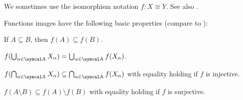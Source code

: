 \begin{definition}
\begin{defenum}
    We sometimes use the isomorphism notation \( f: X \cong Y \). See also .
  \end{defenum}
\end{definition}

\begin{proposition}\label{thm:function_image_properties}
  Functions images have the following basic properties (compare to ):
  \begin{propenum}
     If \( A \subseteq B \), then \( f(A) \subseteq f(B) \).

     \( f(\bigcup_{\al \in \CA} X_\al) = \bigcup_{\al \in \CA} f(X_\al) \).

     \( f(\bigcap_{\al \in \CA} X_\al) \subseteq \bigcap_{\al \in \CA} f(X_\al) \) with equality holding if \( f \) is injective.

     \( f(A \setminus B) \subseteq f(A) \setminus f(B) \) with equality holding if \( f \) is surjective.
  \end{propenum}
\end{proposition}
